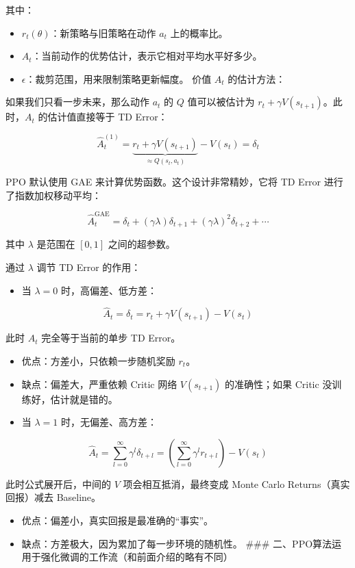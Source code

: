 其中：

\begin{itemize}
\tightlist
\item
  \(r_t(\theta)\)：新策略与旧策略在动作 \(a_t\) 上的概率比。
\item
  \(A_t\)：当前动作的优势估计，表示它相对平均水平好多少。
\item
  \(\epsilon\)：裁剪范围，用来限制策略更新幅度。
  价值 \(A_t\) 的估计方法：
\end{itemize}

如果我们只看一步未来，那么动作 \(a_t\) 的 \(Q\) 值可以被估计为 \(r_t + \gamma V(s_{t+1})\)。此时，\(A_t\) 的估计值直接等于 TD Error：

\[
\hat{A}_t^{(1)}
=
\underbrace{r_t + \gamma V(s_{t+1})}_{\approx Q(s_t,a_t)}
- V(s_t)
=
\delta_t
\]

PPO 默认使用 GAE 来计算优势函数。这个设计非常精妙，它将 TD Error 进行了指数加权移动平均：

\[
\hat{A}_t^{\mathrm{GAE}}
=
\delta_t
+
(\gamma\lambda)\delta_{t+1}
+
(\gamma\lambda)^2\delta_{t+2}
+
\cdots
\]

其中 \(\lambda\) 是范围在 \([0,1]\) 之间的超参数。

通过 \(\lambda\) 调节 TD Error 的作用：

\begin{itemize}
\tightlist
\item
  当 \(\lambda = 0\) 时，高偏差、低方差：
\end{itemize}

\[
\hat{A}_t = \delta_t = r_t + \gamma V(s_{t+1}) - V(s_t)
\]

此时 \(A_t\) 完全等于当前的单步 TD Error。

\begin{itemize}
\tightlist
\item
  优点：方差小，只依赖一步随机奖励 \(r_t\)。
\item
  缺点：偏差大，严重依赖 Critic 网络 \(V(s_{t+1})\) 的准确性；如果 Critic 没训练好，估计就是错的。
\item
  当 \(\lambda = 1\) 时，无偏差、高方差：
\end{itemize}

\[
\hat{A}_t
=
\sum_{l=0}^{\infty}\gamma^l\delta_{t+l}
=
\left(\sum_{l=0}^{\infty}\gamma^l r_{t+l}\right)
- V(s_t)
\]

此时公式展开后，中间的 \(V\) 项会相互抵消，最终变成 Monte Carlo Returns（真实回报）减去 Baseline。

\begin{itemize}
\tightlist
\item
  优点：偏差小，真实回报是最准确的``事实''。
\item
  缺点：方差极大，因为累加了每一步环境的随机性。
  \#\#\# 二、PPO算法运用于强化微调的工作流（和前面介绍的略有不同）
\end{itemize}

